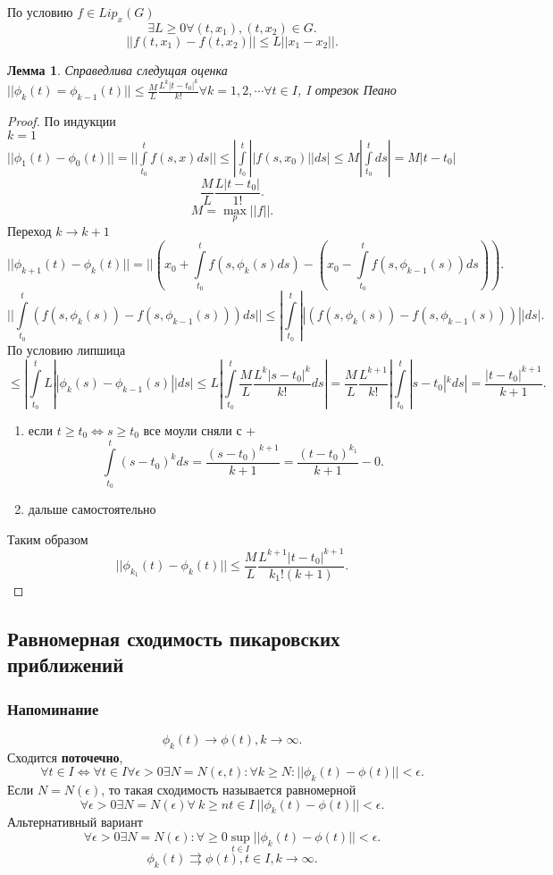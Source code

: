 \documentclass[14pt]{extarticle}
\newtheorem{lemma}[theorem]{Лемма}
\begin{document}
По условию $f \in Lip_{x}(G)$
 \[
 \exists L \ge  0 \forall (t,x_1),(t,x_2) \in G
 .\] 
 \[
 ||f(t,x_1) - f(t,x_2)|| \le  L ||x_1 - x_2||
 .\] 
 \begin{lemma}
     Справедлива следущая оценка $||\phi_{k}(t) = \phi_{k - 1}(t)|| \le  \frac{M}{L} \frac{L^{k}|t-t_0|^{k}}{k!} \forall  k= 1,2,\dotsm \forall  t\in I$, I отрезок Пеано
 \end{lemma}
 \begin{proof}
     По индукции\\
     $k = 1$  $||\phi_1(t) - \phi_{0}(t)|| = || \int\limits_{t_0}^{t} f(s,x) ds || \le |\int\limits_{t_0}^{t} ||f(s,x_{0})|| ds |  \le  M |\int\limits_{t_0}^{t} ds| = M |t - t_0|  $
     \[
     \frac{M}{L} \frac{L|t-t_0|}{1!}
     .\] 
     \[
     M = \max_{p}||f||
     .\] 
     Переход  $k \to k+1$
     \[
     ||\phi_{k+1}(t) - \phi_{k}(t)|| =  || (x_0 + \int\limits_{t_0}^{t} f(s,\phi_{k}(s) ds) - (x_0 - \int\limits_{t_0}^{t} f(s,\phi_{k-1}(s))ds )  )
     .\] 
     \[
     || \int\limits_{t_0}^{t} (f(s,\phi_{k} (s)) - f(s,\phi_{k-1}(s))) ds || \le 
     |\int\limits_{t_0}^{t} ||(f(s,\phi_{k} (s)) - f(s,\phi_{k-1}(s)))|| ds|
     .\] 
     По условию липшица
     \[
     \le | \int\limits_{t_0}^{t} L ||\phi_{k}(s) -\phi_{k-1}(s)||ds| \le 
     L|\int\limits_{t_0}^{t} \frac{M}{L} \frac{L^{k} |s - t_0|^{k}}{k!} ds| = \frac{M}{L}\frac{L^{k + 1}}{k!} |\int\limits_{t_0}^{t} |s-t_0|^{k} ds| = \frac{|t - t_0|^{k+1}}{k+1}
     .\] 
     \begin{enumerate}
         \item если $t \ge  t_0 \iff s \ge  t_0 $ все моули сняли с +
             \[
             \int\limits_{t_0}^{t}  (s - t_0)^k ds = \frac{(s - t_0)^{k+1}}{k+1}  = \frac{(t- t_0)^{k_{1}}}{k+1} - 0
             .\] 
        \item дальше самостоятельно
     \end{enumerate}
     Таким образом
     \[
     ||\phi_{k_{1}} (t)  - \phi_{k}(t)|| \le \frac{M}{L} \frac{L^{k+1} |t -t_0|^{k+1}}{k_1! (k+1)}
     .\] 
 \end{proof}
 \subsection{Равномерная сходимость пикаровских приближений}
 \subsubsection{Напоминание}
 \[
 \phi_{k}(t) \to \phi(t), k \to \infty
 .\] 
 Сходится \textbf{поточечно}, 
 \[
 \forall  t \in I \iff \forall  t \in I \forall  \epsilon >0 \exists  N = N(\epsilon,t) :
 \forall  k \ge  N : ||\phi_{k}(t) - \phi(t)|| < \epsilon
 .\] 
 Если $N = N(\epsilon)$, то такая сходимость называется равномерной
  \[
 \forall  \epsilon  > 0 \exists  N= N(\epsilon) \forall  ~k \ge  n t \in I~ ||\phi_{k}(t) - \phi(t)|| < \epsilon
 .\] 
 Альтернативный вариант
 \[
 \forall  \epsilon > 0 \exists  N = N(\epsilon) : \forall   \ge  0 \sup_{t \in I} ||\phi_{k} (t) - \phi(t) || < \epsilon
 .\] 
 \[
 \phi_{k}(t) \rightrightarrows \phi(t),  t\in I ,k \to \infty
 .\] 
\end{document}
